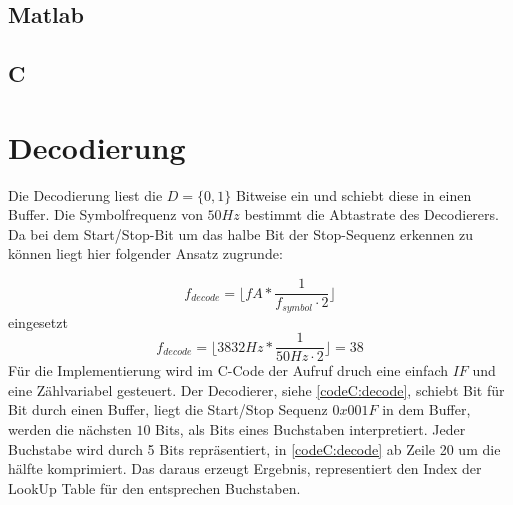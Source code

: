 \documentclass{article}
\begin{document}
\subsection{Matlab}

\subsection{C}

\section{Decodierung}

Die Decodierung liest die $D = \{0,1\}$ Bitweise ein und schiebt diese in einen Buffer. 
Die Symbolfrequenz von $50Hz$ bestimmt die Abtastrate des Decodierers. Da bei dem Start/Stop-Bit um das
halbe Bit der Stop-Sequenz erkennen zu können liegt hier folgender Ansatz zugrunde:

$$
f_{decode} = \lfloor fA * \frac{1}{f_{symbol} \cdot 2}\rfloor 
$$
eingesetzt
$$
f_{decode} = \lfloor 3832Hz * \frac{1}{50Hz\cdot 2}\rfloor = 38
$$
Für die Implementierung wird im C-Code der Aufruf druch eine einfach $IF$ und eine Zählvariabel
gesteuert. Der Decodierer, siehe \ref{codeC:decode}, schiebt Bit für Bit durch einen Buffer, liegt
die Start/Stop Sequenz $0x001F$ in dem Buffer, werden die nächsten $10$ Bits, als Bits eines Buchstaben interpretiert.
Jeder Buchstabe wird durch 5 Bits repräsentiert, in \ref{codeC:decode} ab Zeile 20 um die hälfte komprimiert.
Das daraus erzeugt Ergebnis, representiert den Index der LookUp Table für den entsprechen Buchstaben.
\end{document}
